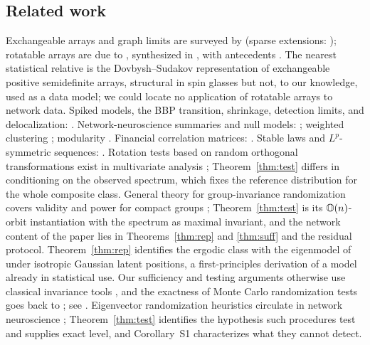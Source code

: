 \subsection{Related work}\label{sec:related}

Exchangeable arrays and graph limits are surveyed by
\citet{austin2008exchangeable,orbanz2015bayesian,lovasz2012large}
(sparse extensions:
\citealp{caron2017sparse,borgs2019lp}); rotatable arrays are due to
\citet{aldous1981representations,kallenberg1988some,kallenberg1995multivariate},
synthesized in \citet[Chapter~8]{kallenberg2005probabilistic}, with
antecedents \citep{freedman1962invariants,dawid1977,schoenberg1938,vershik2002}. The nearest
statistical relative is the Dovbysh--Sudakov representation of
exchangeable positive semidefinite arrays, structural in spin glasses
\citep{dovbysh1982gram,panchenko2013sherrington} but not, to our
knowledge, used as a data model; we could locate no application of
rotatable arrays to network data. Spiked models, the BBP transition, shrinkage, detection limits, and
delocalization:
\citet{johnstone2001distribution,baik2005phase,feral2007largest,capitaine2009largest,benaych2011eigenvalues,bai2008central,donoho2018optimal,onatski2013asymptotic,perry2018optimality,orourke2016eigenvectors}.
Network-neuroscience summaries and null models:
\citet{bullmore2009complex,rubinov2010complex,vasa2022null}; weighted
clustering \citep{onnela2005intensity}; modularity \citep{newman2006}.
Financial correlation matrices:
\citet{laloux1999noise,plerou2002random,bouchaud2009}. Stable laws and
$L^p$-symmetric sequences:
\citet{bretagnolle1966lois,cambanis1983alpha,samorodnitsky1994stable}.
Rotation tests based on random orthogonal transformations exist in
multivariate analysis \citep{langsrud2005rotation,perry2010rotation};
Theorem~\ref{thm:test} differs in conditioning on the observed
spectrum, which fixes the reference distribution for the whole
composite class. General theory for group-invariance randomization
covers validity and power for compact groups
\citep{dobriban2022consistency,koning2024more}; Theorem~\ref{thm:test}
is its $\mathbb{O}(n)$-orbit instantiation with the spectrum as maximal
invariant, and the network content of the paper lies in
Theorems~\ref{thm:rep} and \ref{thm:suff} and the residual protocol.
Theorem~\ref{thm:rep} identifies the ergodic class with the eigenmodel
of \citet{hoff2008eigenmodel} under isotropic Gaussian latent
positions, a first-principles derivation of a model already in
statistical use. Our sufficiency and testing arguments otherwise use
classical invariance tools \citep{eaton1989group,lehmann2005testing},
and the exactness of Monte Carlo randomization tests goes back to
\citet{dwass1957}; see \citet{hemerik2018exact}. Eigenvector randomization heuristics
circulate in network neuroscience \citep{vasa2022null};
Theorem~\ref{thm:test} identifies the hypothesis such procedures test
and supplies exact level, and Corollary~S1 characterizes what they
cannot detect.

